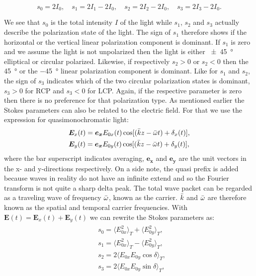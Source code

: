 \begin{equation}
    \label{eq:stokes_param_int}
    s_0 = 2 I_0, \quad 
    s_1 = 2 I_1 - 2 I_0, \quad 
    s_2 = 2 I_2 - 2 I_0, \quad 
    s_3 = 2 I_3 - 2 I_0.
\end{equation}

We see that $s_0$ is the total intensity $I$ of the light while $s_1$, $s_2$ and $s_3$ actually describe the polarization state of the light. The sign of $s_1$ therefore shows if the horizontal or the vertical linear polarization component is dominant. If $s_1$ is zero and we assume the light is not unpolarized then the light is either \SI{\pm 45}{\degree} elliptical or circular polarized. Likewise, if respectively $s_2>0$ or $s_2<0$ then the \SI{45}{\degree} or the \SI{-45}{\degree} linear polarization component is dominant. Like for $s_1$ and $s_2$, the sign of $s_3$ indicates which of the two circular polarization states is dominant, $s_3>0$ for RCP and $s_3<0$ for LCP. Again, if the respective parameter is zero then there is no preference for that polarization type. As mentioned earlier the Stokes parameters can also be related to the electric field. For that we use the expression for quasimonochromatic light:
\begin{align}
\begin{split}
    \label{eq:quasi_mono_efields}
    &\bm{E}_x(t) = \bm{e_x}E_{0x}(t)\cos [(\Bar{k}z-\Bar{\omega} t) + \delta_x(t)], \\
    &\bm{E}_y(t) = \bm{e_x}E_{0y}(t)\cos [(\Bar{k}z-\Bar{\omega} t) + \delta_y(t)],
\end{split}
\end{align}
where the bar superscript indicates averaging, $\bm{e_x}$ and $\bm{e_y}$ are the unit vectors in the x- and y-directions respectively. On a side note, the quasi prefix is added because waves in reality do not have an infinite extend and so the Fourier transform is not quite a sharp delta peak. The total wave packet can be regarded as a traveling wave of frequency $\Bar{\omega}$, known as the carrier. $\Bar{k}$ and $\Bar{\omega}$ are therefore known as the spatial and temporal carrier frequencies. 
With $\bm{E}(t)=\bm{E}_x(t)+\bm{E}_y(t)$ we can rewrite the Stokes parameters as:
\begin{align}
\begin{split}
    \label{eq:stokes_param_e}
    &s_0 = \langle E_{0x}^2 \rangle_T + \langle E_{0y}^2 \rangle_T, \\
    &s_1 = \langle E_{0x}^2 \rangle_T - \langle E_{0y}^2 \rangle_T, \\
    &s_2 = 2\langle E_{0x}E_{0y}\cos \delta \rangle_T, \\
    &s_3 = 2\langle E_{0x}E_{0y}\sin \delta \rangle_T,
\end{split}
\end{align}
